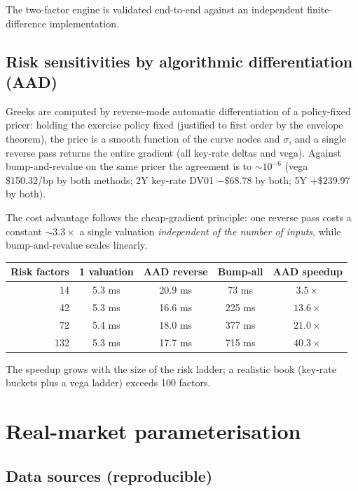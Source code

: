 \documentclass[11pt]{article}
\begin{document}
\noindent The two-factor engine is validated end-to-end against an independent
finite-difference implementation.

\subsection{Risk sensitivities by algorithmic differentiation (AAD)}

Greeks are computed by reverse-mode automatic differentiation of a policy-fixed pricer:
holding the exercise policy fixed (justified to first order by the envelope theorem), the
price is a smooth function of the curve nodes and $\sigma$, and a single reverse pass
returns the entire gradient (all key-rate deltas and vega). Against bump-and-revalue on
the same pricer the agreement is to $\sim 10^{-6}$ (vega \$150.32/bp by both methods; 2Y
key-rate DV01 $-\$68.78$ by both; 5Y $+\$239.97$ by both).

The cost advantage follows the cheap-gradient principle: one reverse pass costs a constant
$\sim 3.3\times$ a single valuation \emph{independent of the number of inputs}, while
bump-and-revalue scales linearly.

\begin{center}
\begin{tabular}{rcccc}
\toprule
Risk factors & 1 valuation & AAD reverse & Bump-all & AAD speedup \\
\midrule
14  & 5.3 ms & 20.9 ms & 73 ms  & $3.5\times$ \\
42  & 5.3 ms & 16.6 ms & 225 ms & $13.6\times$ \\
72  & 5.4 ms & 18.0 ms & 377 ms & $21.0\times$ \\
132 & 5.3 ms & 17.7 ms & 715 ms & $40.3\times$ \\
\bottomrule
\end{tabular}
\end{center}

\noindent The speedup grows with the size of the risk ladder; a realistic book (key-rate
buckets plus a vega ladder) exceeds 100 factors.

\section{Real-market parameterisation}

\subsection{Data sources (reproducible)}
\end{document}
